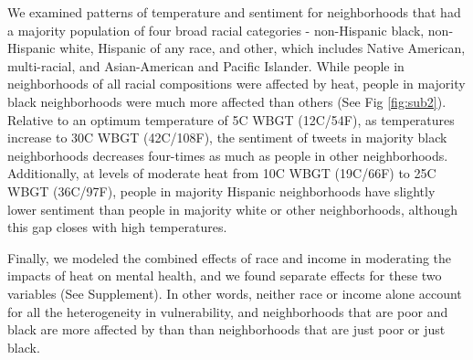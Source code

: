 \documentclass{article}
\begin{document}
We examined patterns of temperature and sentiment for neighborhoods that had a majority population of four broad racial categories - non-Hispanic black, non-Hispanic white, Hispanic of any race, and other, which includes Native American, multi-racial, and Asian-American and Pacific Islander.  While people in neighborhoods of all racial compositions were affected by heat, people in majority black neighborhoods were much more affected than others  (See Fig \ref{fig:sub2}).  Relative to an optimum temperature of 5\textdegree C WBGT (12\textdegree C/54\textdegree F), as temperatures increase to 30\textdegree C WBGT (42\textdegree C/108\textdegree F), the sentiment of tweets in majority black neighborhoods decreases four-times as much as people in other neighborhoods.  Additionally, at levels of moderate heat from 10\textdegree C WBGT (19\textdegree C/66\textdegree F) to 25\textdegree C WBGT (36\textdegree C/97\textdegree F), people in majority Hispanic neighborhoods have slightly lower sentiment than people in majority white or other neighborhoods, although this gap closes with high temperatures.

Finally, we modeled the combined effects of race and income in moderating the impacts of heat on mental health, and we found separate effects for these two variables (See Supplement).  In other words, neither race or income alone account for all the heterogeneity in vulnerability, and neighborhoods that are poor and black are more affected by than than neighborhoods that are just poor or just black.
\end{document}
